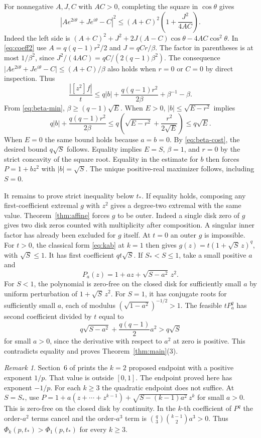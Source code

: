 \documentclass[11pt]{article}
\numberwithin{equation}{section}
\theoremstyle{remark}
\newtheorem{remark}[theorem]{Remark}
\newcommand{\coef}[1]{[z^{#1}]}
\begin{document}
For nonnegative \(A,J,C\) with \(AC>0\), completing the square in
\(\cos\theta\) gives
\[
  |Ae^{2i\theta}+Je^{i\theta}-C|^2
  \le (A+C)^2\left(1+\frac{J^2}{4AC}\right).
\]
Indeed the left side is
\((A+C)^2+J^2+2J(A-C)\cos\theta-4AC\cos^2\theta\).
In \eqref{eq:coeff2} use \(A=q(q-1)r^2/2\) and \(J=qCr/\beta\).
The factor in parentheses is at most \(1/\beta^2\), since
\(J^2/(4AC)=qC/(2(q-1)\beta^2)\).
The consequence \(\lvert Ae^{2i\theta}+Je^{i\theta}-C\rvert
\le (A+C)/\beta\) also holds when \(r=0\) or \(C=0\) by
direct inspection. Thus
\[
 \frac{|\coef{2}f|}{t}
   \le q|b|+\frac{q(q-1)r^2}{2\beta}+\beta^{-1}-\beta .
\]
From \eqref{eq:beta-min}, \(\beta\ge(q-1)\sqrt E\).
When \(E>0\), \( |b|\le\sqrt{E-r^2}\) implies
\[
 q|b|+\frac{q(q-1)r^2}{2\beta}
 \le q\left(\sqrt{E-r^2}+\frac{r^2}{2\sqrt E}\right)
 \le q\sqrt E.
\]
When \(E=0\) the same bound holds because \(a=b=0\).
By \eqref{eq:beta-cost}, the desired bound \(q\sqrt S\) follows.
Equality implies \(E=S\), \(\beta=1\), and \(r=0\) by the strict
concavity of the square root. Equality in the estimate for \(b\)
then forces \(P=1+bz^2\) with \(|b|=\sqrt S\). The unique
positive-real maximizer follows, including \(S=0\).

It remains to prove strict inequality below \(t_*\).
If equality holds, composing any first-coefficient extremal \(g\)
with \(z^2\) gives a degree-two extremal with the same value.
Theorem~\ref{thm:affine} forces \(g\) to be outer.
Indeed a single disk zero of \(g\) gives two disk zeros counted
with multiplicity after composition. A singular inner factor has
already been excluded for \(g\) itself. At \(t=0\) an outer \(g\) is
impossible. For \(t>0\), the classical form \eqref{eq:kab} at \(k=1\)
then gives \(g(z)=t(1+\sqrt S\,z)^q\), with \(\sqrt S\le1\).
It has first coefficient \(qt\sqrt S\).
If \(S_*<S\le1\), take a small positive \(a\) and
\[
  P_a(z)=1+az+\sqrt{S-a^2}\,z^2.
\]
For \(S<1\), the polynomial is zero-free on the closed disk for
sufficiently small \(a\) by uniform perturbation of \(1+\sqrt S\,z^2\).
For \(S=1\), it has conjugate roots for sufficiently small \(a\),
each of modulus \((\sqrt{1-a^2})^{-1/2}>1\).
The feasible \(tP_a^q\) has second coefficient divided by \(t\)
equal to
\[
   q\sqrt{S-a^2}+\frac{q(q-1)}2 a^2>q\sqrt S
\]
for small \(a>0\), since the derivative with respect to \(a^2\) at
zero is positive. This contradicts equality and proves
Theorem~\ref{thm:main}(3).

\begin{remark}
Section~6 of \cite{BGI} prints the \(k=2\) proposed endpoint with a
positive exponent \(1/p\). That value is outside \([0,1]\).
The endpoint proved here has exponent \(-1/p\).
For each \(k\ge3\) the quadratic endpoint does not suffice.
At \(S=S_*\), use \(P=1+a(z+\cdots+z^{k-1})+
\sqrt{S-(k-1)a^2}\,z^k\) for small \(a>0\).
This is zero-free on the closed disk by continuity. In the
\(k\)-th coefficient of \(P^q\) the order-\(a^2\) terms cancel
and the order-\(a^3\) term is
\(\binom{q}{3}\binom{k-1}{2}a^3>0\).
Thus \(\Phi_k(p,t_*)>\Phi_1(p,t_*)\) for every \(k\ge3\).
\end{remark}
\end{document}
